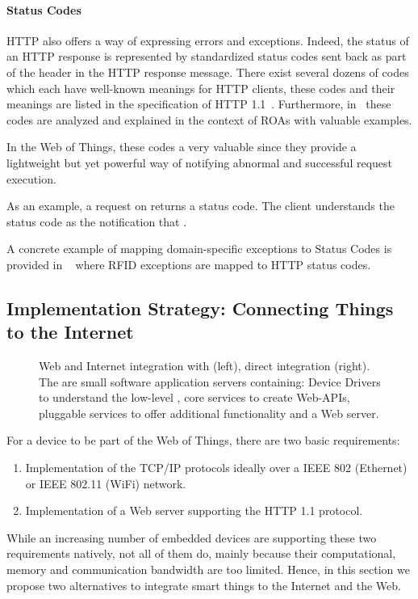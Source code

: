 \paragraph{Status Codes}
HTTP also offers a way of expressing errors and exceptions. Indeed, the status of an HTTP response is represented by standardized status codes sent back as part of the header in the HTTP response message. There exist several dozens of codes which each have well-known meanings for HTTP clients, these codes and their meanings are listed in the specification of HTTP 1.1~\cite{HTTP1999}. Furthermore, in~\cite{Richardson2007} these codes are analyzed and explained in the context of ROAs with valuable examples.

In the Web of Things, these codes a very valuable since they provide a lightweight but yet powerful way of notifying abnormal and successful request execution. 

As an example, a  request on  returns a  status code. The client understands the status code as the notification that .

A concrete example of mapping domain-specific exceptions to Status Codes is provided in ~ where RFID exceptions are mapped to HTTP status codes.

\subsection{Implementation Strategy: Connecting Things to the Internet}\label{gateways}
\begin{figure}
\caption{Web and Internet integration with \sgs{} (left), direct integration (right). The \sgs{} are small software application servers containing: Device Drivers to understand the low-level \sts{}, core services to create Web-APIs, pluggable services to offer additional functionality and a Web server.}
\label{fig:smartGateways}
\end{figure}
For a device to be part of the Web of Things, there are two basic requirements:
\begin{enumerate}
 \item Implementation of the TCP/IP protocols ideally over a IEEE 802 (Ethernet) or IEEE 802.11 (WiFi) network.
 \item Implementation of a Web server supporting the HTTP 1.1 protocol.
\end{enumerate}
While an increasing number of embedded devices are supporting these two requirements natively, not all of them do, mainly because their computational, memory and communication bandwidth are too limited. Hence, in this section we propose two alternatives to integrate smart things to the Internet and the Web.

